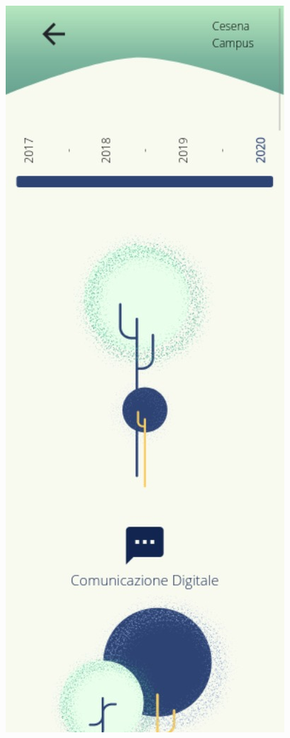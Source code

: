 \begin{figure}[H]
\begin{minipage}{.5\textwidth}
  \label{fig:homepageMob}
\end{minipage}%
\begin{minipage}{.5\textwidth}
  \centering
  \includegraphics[width=.9\linewidth]{img/categoryMobile.png}
  \label{fig:catMob}
\end{minipage}
\end{figure}


